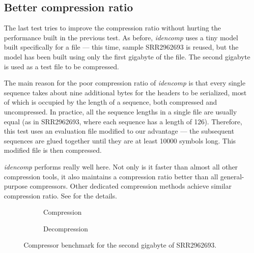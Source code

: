 \newpage

\subsection{Better compression ratio}\label{subsec:better-ratio}

The last test tries to improve the compression ratio without hurting the
performance built in the previous test.
As before, \emph{idencomp} uses a tiny model built specifically for a file
--- this time, sample SRR2962693 is reused, but the model has been built
using only the first gigabyte of the file.
The second gigabyte is used as a test file to be compressed.

The main reason for the poor compression ratio of \emph{idencomp} is that
every single sequence takes about nine additional bytes for the headers to be
serialized, most of which is occupied by the length of a sequence, both
compressed and uncompressed.
In practice, all the sequence lengths in a single file are usually equal (as
in SRR2962693, where each sequence has a length of 126).
Therefore, this test uses an evaluation file modified to our advantage ---
the subsequent sequences are glued together until they are at least 10000
symbols long.
This modified file is then compressed.

\emph{idencomp} performs really well here.
Not only is it faster than almost all other compression tools, it also
maintains a compression ratio better than all general-purpose compressors.
Other dedicated compression methods achieve similar compression ratio.
See  for the details.

\begin{figure}[h]
    \begin{subfigure}{\textwidth}
        \centering
        
        \caption{Compression}
    \end{subfigure}
    \begin{subfigure}{\textwidth}
        \centering
        \vspace{1em}
        
        \caption{Decompression}
    \end{subfigure}
    \caption{%
        Compressor benchmark for the second gigabyte of SRR2962693.
    }
    \label{fig:bench-better-ratio}
\end{figure}
